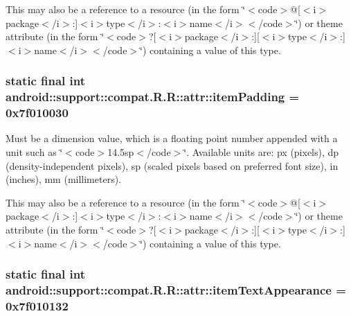 This may also be a reference to a resource (in the form \char`\"{}$<$code$>$@\mbox{[}$<$i$>$package$<$/i$>$:\mbox{]}$<$i$>$type$<$/i$>$:$<$i$>$name$<$/i$>$$<$/code$>$\char`\"{}) or theme attribute (in the form \char`\"{}$<$code$>$?\mbox{[}$<$i$>$package$<$/i$>$:\mbox{]}\mbox{[}$<$i$>$type$<$/i$>$:\mbox{]}$<$i$>$name$<$/i$>$$<$/code$>$\char`\"{}) containing a value of this type. \hypertarget{classandroid_1_1support_1_1compat_1_1_r_1_1attr_c740ede48d9f4b81a9bc86edadd5846c}{
\subsubsection[{itemPadding}]{\setlength{\rightskip}{0pt plus 5cm}static final int android::support::compat.R.R::attr::itemPadding = 0x7f010030}}
\label{classandroid_1_1support_1_1compat_1_1_r_1_1attr_c740ede48d9f4b81a9bc86edadd5846c}


Must be a dimension value, which is a floating point number appended with a unit such as \char`\"{}$<$code$>$14.5sp$<$/code$>$\char`\"{}. Available units are: px (pixels), dp (density-independent pixels), sp (scaled pixels based on preferred font size), in (inches), mm (millimeters). 

This may also be a reference to a resource (in the form \char`\"{}$<$code$>$@\mbox{[}$<$i$>$package$<$/i$>$:\mbox{]}$<$i$>$type$<$/i$>$:$<$i$>$name$<$/i$>$$<$/code$>$\char`\"{}) or theme attribute (in the form \char`\"{}$<$code$>$?\mbox{[}$<$i$>$package$<$/i$>$:\mbox{]}\mbox{[}$<$i$>$type$<$/i$>$:\mbox{]}$<$i$>$name$<$/i$>$$<$/code$>$\char`\"{}) containing a value of this type. \hypertarget{classandroid_1_1support_1_1compat_1_1_r_1_1attr_95e2f57dce38282a93561c8605958bbe}{
\subsubsection[{itemTextAppearance}]{\setlength{\rightskip}{0pt plus 5cm}static final int android::support::compat.R.R::attr::itemTextAppearance = 0x7f010132}}
\label{classandroid_1_1support_1_1compat_1_1_r_1_1attr_95e2f57dce38282a93561c8605958bbe}


